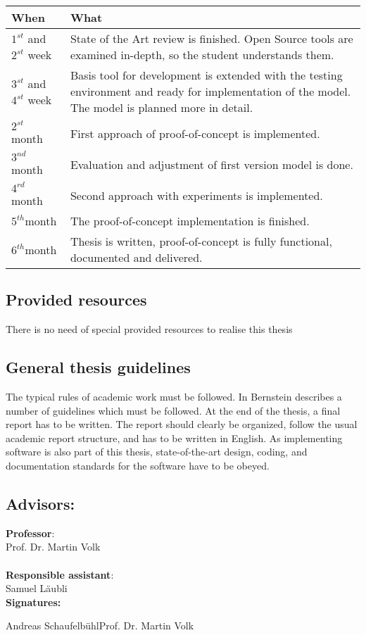 \documentclass{task_description}
\begin{document}
\begin{tabular}{lp{10cm}}
When & What \\
\hline\noalign{\smallskip}
$1^{\mathit{st}}$ and $2^{\mathit{st}}$ week & State of the Art review is finished. Open Source tools are examined in-depth, so the student understands them. \\
$3^{\mathit{st}}$ and $4^{\mathit{st}}$ week & Basis tool for development is extended with the testing environment and ready for implementation of the model. The model is planned more in detail.\\
$2^{\mathit{st}}$ month & First approach of proof-of-concept is implemented. \\
$3^{\mathit{nd}}$ month & Evaluation and adjustment of first version model is done. \\
$4^{\mathit{rd}}$ month & Second approach with experiments is implemented. \\
$5^{\mathit{th}}$month & The proof-of-concept implementation is finished.\\
$6^{\mathit{th}}$month & Thesis is written, proof-of-concept is fully functional, documented and delivered.
\end{tabular}

\newpage

\subsection*{Provided resources}

There is no need of special provided resources to realise this thesis

\subsection*{General thesis guidelines}

The typical rules of academic work must be followed. In
\cite{Bernstein} Bernstein describes a number of guidelines which
must be followed. At the end of the thesis, a final report has to be
written. The report should clearly be organized, follow the usual academic
report structure, and has to be written in English. As implementing software is also part of this thesis, state-of-the-art
design, coding, and documentation standards for the software have to be obeyed.

\subsection*{Advisors:}

\noindent\textbf{Professor}: \\
\noindent Prof. Dr. Martin Volk \\
\\
\noindent\textbf{Responsible assistant}: \\
\noindent Samuel L\"aubli \\

\vspace{2em}
\noindent\textbf{Signatures:}

\vspace{3\baselineskip}
\noindent Andreas Schaufelb\"uhl\hfill Prof. Dr. Martin Volk
\clearpage


\end{document}
